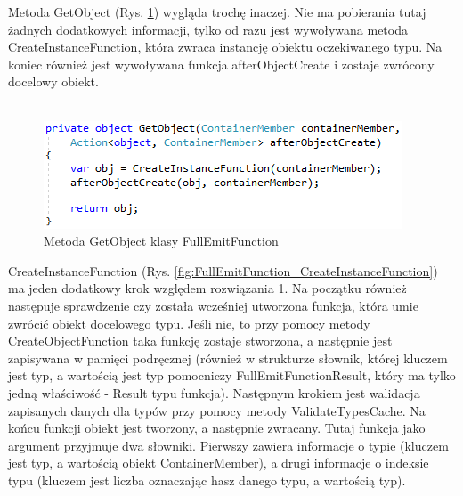 \documentclass[12pt]{article}
\begin{document}
Metoda GetObject (Rys. \ref{fig:FullEmitFunction_GetObject}) wygląda trochę inaczej. Nie ma pobierania tutaj żadnych dodatkowych informacji, tylko od razu jest wywoływana metoda CreateInstanceFunction, która zwraca instancję obiektu oczekiwanego typu. Na koniec również jest wywoływana funkcja afterObjectCreate i zostaje zwrócony docelowy obiekt.\\ \\
\begin{figure}[H]
	\begin{center}
  		\includegraphics{FullEmitFunction_GetObject.png}
  		\caption{Metoda GetObject klasy FullEmitFunction}
  		\label{fig:FullEmitFunction_GetObject}
	\end{center}
\end{figure}

CreateInstanceFunction (Rys. \ref{fig:FullEmitFunction_CreateInstanceFunction}) ma jeden dodatkowy krok względem rozwiązania 1. Na początku również następuje sprawdzenie czy została wcześniej utworzona funkcja, która umie zwrócić obiekt docelowego typu. Jeśli nie, to przy pomocy metody CreateObjectFunction taka funkcję zostaje stworzona, a następnie jest zapisywana w pamięci podręcznej (również w strukturze słownik, której kluczem jest typ, a wartością jest typ pomocniczy FullEmitFunctionResult, który ma tylko jedną właściwość - Result typu funkcja). Następnym krokiem jest walidacja zapisanych danych dla typów przy pomocy metody ValidateTypesCache. Na końcu funkcji obiekt jest tworzony, a następnie zwracany. Tutaj funkcja jako argument przyjmuje dwa słowniki. Pierwszy zawiera informacje o typie (kluczem jest typ, a wartością obiekt ContainerMember), a drugi informacje o indeksie typu (kluczem jest liczba oznaczając hasz danego typu, a wartością typ).\\
\end{document}
